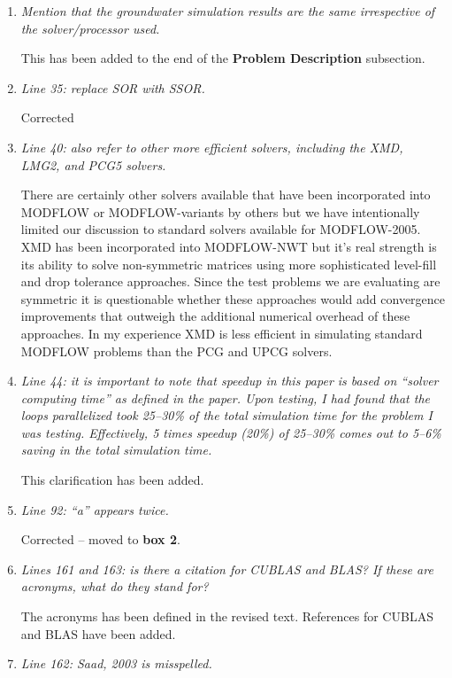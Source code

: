 \documentclass[12pt]{article} %
\begin{document}
\begin{enumerate}
\item \textit{Mention that the groundwater simulation results are the same irrespective of the solver/processor used.}

This has been added to the end of the \textbf{Problem Description} subsection.

\item \textit{Line 35: replace SOR with SSOR.}

Corrected

\item \textit{Line 40: also refer to other more efficient solvers, including the XMD, LMG2, and PCG5 solvers.}

There are certainly other solvers available that have been incorporated into MODFLOW or MODFLOW-variants by others but we have intentionally limited our discussion to standard solvers available for MODFLOW-2005. XMD has been incorporated into MODFLOW-NWT but it's real strength is its ability to solve non-symmetric matrices using more sophisticated level-fill and drop tolerance approaches. Since the test problems we are evaluating are symmetric it is questionable whether these approaches would add convergence improvements that outweigh the additional numerical overhead of these approaches. In my experience XMD is less efficient in simulating standard MODFLOW problems than the PCG and UPCG solvers. 

\item \textit{Line 44: it is important to note that speedup in this paper is based on ``solver computing time'' as defined in the paper. Upon testing, I had found that the loops parallelized took 25--30\% of the total simulation time for the problem I was testing. Effectively, 5 times speedup (20\%) of 25--30\% comes out to 5--6\% saving in the total simulation time.}

This clarification has been added.

\item \textit{Line 92: “a” appears twice.}

Corrected -- moved to \textbf{box 2}.

\item \textit{Lines 161 and 163: is there a citation for CUBLAS and BLAS? If these are acronyms, what do they stand for?}

The acronyms has been defined in the revised text. References for CUBLAS and BLAS have been added.

\item \textit{Line 162: Saad, 2003 is misspelled.}


\end{enumerate}
\end{document}
